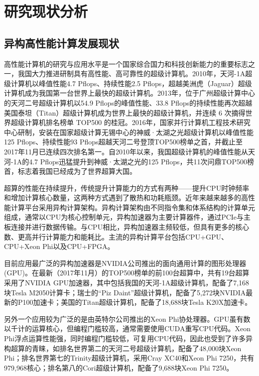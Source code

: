 \chapter{研究现状分析}
\label{ch:研究现状分析}

\section{异构高性能计算发展现状}
高性能计算机的研究与应用水平是一个国家综合国力和科技创新能力的重要标志之一，我国大力推进研制具有高性能、高可靠性的超级计算机。2010年，天河-1A\cite{yang2011tianhe}超级计算机以峰值性能4.7 Pflops、持续性能2.5 Pflops，超越美洲虎（Jaguar）超级计算机成为我国第一台世界上最快的超级计算机。2013年，位于广州超级计算中心的天河二号超级计算机\cite{liao2014milkyway}以54.9 Pflops的峰值性能、33.8 Pflops的持续性能再次超越美国泰坦（Titan）超级计算机成为世界上最快的超级计算机，并连续 6 次摘得世界超级计算机排名榜单 TOP500 的桂冠。2016年，国家并行计算机工程技术研究中心研制，安装在国家超级计算无锡中心的神威·太湖之光\cite{fu2016sunway}超级计算机以峰值性能125 Pflops、持续性能93 Pflops超越天河二号登顶TOP500榜单之首，并截止至2017年11月已连续四次排名第一。自2010年以来，我国超级计算机的峰值性能从天河-1A的4.7 Pflops迅猛提升到神威·太湖之光的125 Pflops，共11次问鼎TOP500榜首，标志着我国已经成为了世界超算大国。

超算的性能在持续提升，传统提升计算能力的方式有两种——提升CPU时钟频率和增加计算核心数量，这两种方式遇到了散热和功耗瓶颈。近年来越来越多的高性能计算平台采用异构计算架构\cite{buyya1999high}。异构计算架构由不同指令集和体系结构的计算单元组成，通常以CPU为核心控制单元，异构加速器为主要计算器件，通过PCIe与主板连接并进行数据传输。与CPU相比，异构加速器主频较低，但具有更多的核心数、更高并行计算能力和能耗比\cite{hong2010integrated}。主流的异构计算平台包括CPU+GPU、CPU+Xeon Phi以及CPU+FPGA。

目前应用最广泛的异构加速器是NVIDIA公司推出的面向通用计算的图形处理器\cite{nvidia2008programming}(GPU)。在最新（2017年11月）的TOP500榜单的前100台超算中，共有19台超算采用了NVIDIA GPU加速器，其中包括我国的天河-1A超级计算机，配备了7,168块Tesla M2050计算卡；瑞士的“Piz Daint”超级计算机\cite{PIZDAINT}，配备了5,272块NVIDIA最新的P100加速卡；美国的Titan超级计算机\cite{shimpi2012inside}，配备了18,688块Tesla K20X加速卡。

另外一个应用较为广泛的是由英特尔公司推出的Xeon Phi协处理器\cite{jeffers2013intel}。GPU虽有数以千计的运算核心，但编程门槛较高，通常需要使用CUDA\cite{cook2012cuda}重写CPU代码。Xeon Phi浮点运算性能强，同时编程门槛较低，可复用CPU代码，因此也受到了许多异构超算的青睐，如排名世界第二的天河二号超级计算机，配备了48,000块Xeon Phi\cite{liao2014milkyway}；排名世界第七的Trinity超级计算机\cite{Trinity}，采用Cray XC40和Xeon Phi 7250，共有979,968核心；排名第八的Cori超级计算机\cite{doerfler2018evaluating}，配备了9,688块Xeon Phi 7250。

